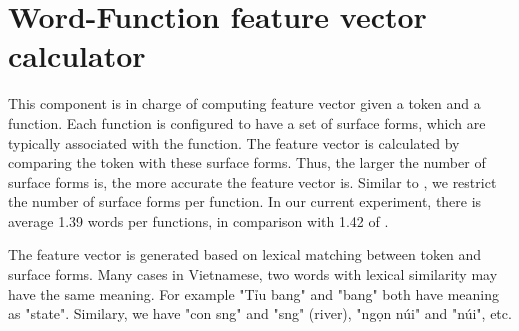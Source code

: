 \section{Word-Function feature vector calculator}
\label{sec:model.word-function}
This component is in charge of computing feature vector given a token and a function. Each function is configured to have a set of surface forms, which are typically associated with the function. The feature vector is calculated by comparing the token with these surface forms. Thus, the larger the number of surface forms is, the more accurate the feature vector is. Similar to \cite{Clarke:2010:DSP:1870568.1870571}, we restrict the number of surface forms per function. In our current experiment, there is average 1.39 words per functions, in comparison with 1.42 of \cite{Clarke:2010:DSP:1870568.1870571}.

The feature vector is generated based on lexical matching between token and surface forms. Many cases in Vietnamese, two words with lexical similarity may have the same meaning. For example "{\selectfont Ti\h\ecircumflex u bang" and "bang" both have meaning as "state". Similary, we have "con s\ocircumflex ng" and "s\ocircumflex ng" (river), "ng\d{o}n n\'ui" and "n\'ui", etc.} 
